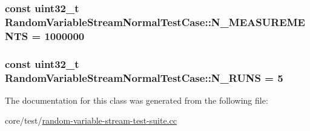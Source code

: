 \subsubsection[{\texorpdfstring{N\+\_\+\+M\+E\+A\+S\+U\+R\+E\+M\+E\+N\+TS}{N_MEASUREMENTS}}]{\setlength{\rightskip}{0pt plus 5cm}const uint32\+\_\+t Random\+Variable\+Stream\+Normal\+Test\+Case\+::\+N\+\_\+\+M\+E\+A\+S\+U\+R\+E\+M\+E\+N\+TS = 1000000\hspace{0.3cm}{\ttfamily [static]}}\hypertarget{classRandomVariableStreamNormalTestCase_a8aa4e12111094e204d6019bb0c48b4cf}{}\label{classRandomVariableStreamNormalTestCase_a8aa4e12111094e204d6019bb0c48b4cf}
\subsubsection[{\texorpdfstring{N\+\_\+\+R\+U\+NS}{N_RUNS}}]{\setlength{\rightskip}{0pt plus 5cm}const uint32\+\_\+t Random\+Variable\+Stream\+Normal\+Test\+Case\+::\+N\+\_\+\+R\+U\+NS = 5\hspace{0.3cm}{\ttfamily [static]}}\hypertarget{classRandomVariableStreamNormalTestCase_a6ba9c6a6a0f6f62446ddb88804fde2bd}{}\label{classRandomVariableStreamNormalTestCase_a6ba9c6a6a0f6f62446ddb88804fde2bd}


The documentation for this class was generated from the following file\+:\begin{DoxyCompactItemize}
\item 
core/test/\hyperlink{random-variable-stream-test-suite_8cc}{random-\/variable-\/stream-\/test-\/suite.\+cc}\end{DoxyCompactItemize}
